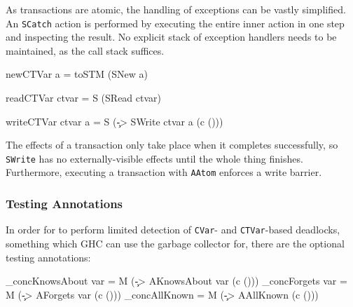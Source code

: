 

As transactions are atomic, the handling of exceptions can be vastly
simplified. An \verb|SCatch| action is performed by executing the
entire inner action in one step and inspecting the result. No explicit
stack of exception handlers needs to be maintained, as the call stack
suffices.

\begin{haskellcode}
newCTVar a = toSTM (SNew a)
\end{haskellcode}


\begin{haskellcode}
readCTVar ctvar = S (SRead ctvar)
\end{haskellcode}


\begin{haskellcode}
writeCTVar ctvar a = S (\c -> SWrite ctvar a (c ()))
\end{haskellcode}


The effects of a transaction only take place when it completes
successfully, so \verb|SWrite| has no externally-visible effects until
the whole thing finishes. Furthermore, executing a transaction with
\verb|AAtom| enforces a write barrier.

\subsubsection{Testing Annotations}
\label{sec:execution-primops-annotations}

In order for \dejafu{} to perform limited detection of \verb|CVar|-
and \verb|CTVar|-based deadlocks, something which GHC can use the
garbage collector for, there are the optional testing annotations:

\begin{haskellcode}
_concKnowsAbout var = M (\c -> AKnowsAbout var (c ()))
_concForgets    var = M (\c -> AForgets    var (c ()))
_concAllKnown       = M (\c -> AAllKnown       (c ()))
\end{haskellcode}

